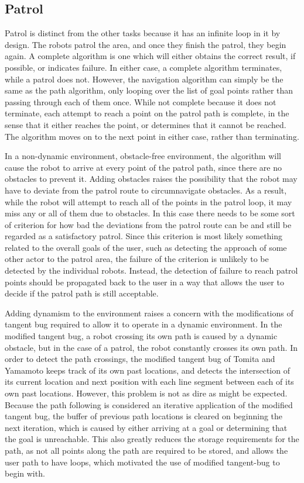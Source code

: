 \subsection{Patrol}

Patrol is distinct from the other tasks because it has an infinite loop in it by design. The robots patrol the area, and once they finish the patrol, they begin again. 
A complete algorithm is one which will either obtains the correct result, if possible, or indicates failure. 
In either case, a complete algorithm terminates, while a patrol does not. 
However, the navigation algorithm can simply be the same as the path algorithm, only looping over the list of goal points rather than passing through each of them once. 
While not complete because it does not terminate, each attempt to reach a point on the patrol path is complete, in the sense that it either reaches the point, or determines that it cannot be reached. 
The algorithm moves on to the next point in either case, rather than terminating. 

In a non-dynamic environment, obstacle-free environment, the algorithm will cause the robot to arrive at every point of the patrol path, since there are no obstacles to prevent it.
Adding obstacles raises the possibility that the robot may have to deviate from the patrol route to circumnavigate obstacles. 
As a result, while the robot will attempt to reach all of the points in the patrol loop, it may miss any or all of them due to obstacles. 
In this case there needs to be some sort of criterion for how bad the deviations from the patrol route can be and still be regarded as a satisfactory patrol.
Since this criterion is most likely something related to the overall goals of the user, such as detecting the approach of some other actor to the patrol area, the failure of the criterion is unlikely to be detected by the individual robots. 
Instead, the detection of failure to reach patrol points should be propagated back to the user in a way that allows the user to decide if the patrol path is still acceptable. 

Adding dynamism to the environment raises a concern with the modifications of tangent bug required to allow it to operate in a dynamic environment. 
In the modified tangent bug, a robot crossing its own path is caused by a dynamic obstacle, but in the case of a patrol, the robot constantly crosses its own path. 
In order to detect the path crossings, the modified tangent bug of Tomita and Yamamoto keeps track of its own past locations, and detects the intersection of its current location and next position with each line segment between each of its own past locations. 
However, this problem is not as dire as might be expected. 
Because the path following is considered an iterative application of the modified tangent bug, the buffer of previous path locations is cleared on beginning the next iteration, which is caused by either arriving at a goal or determining that the goal is unreachable. 
This also greatly reduces the storage requirements for the path, as not all points along the path are required to be stored, and allows the user path to have loops, which motivated the use of modified tangent-bug to begin with. 

